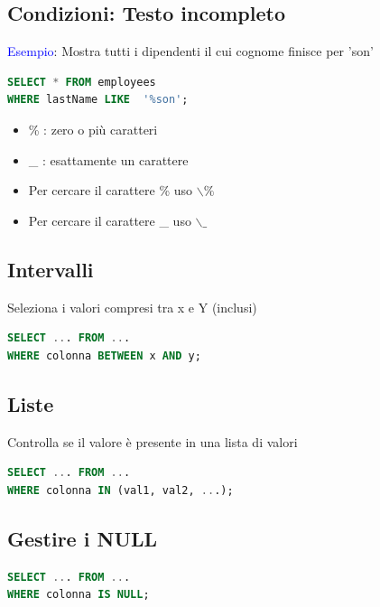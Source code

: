 \documentclass[12pt,a4paper]{article}
\begin{document}
\subsection{Condizioni: Testo incompleto}
\textcolor{blue}{Esempio}: Mostra tutti i dipendenti il cui cognome finisce per 'son'\\
\begin{lstlisting}[language = SQL]
SELECT * FROM employees
WHERE lastName LIKE  '%son';
\end{lstlisting}
\begin{itemize}
\item \% : zero o più caratteri
\item \_ : esattamente un carattere
\item Per cercare il carattere \% uso $\backslash\%$
\item Per cercare il carattere \_ uso $\backslash\_$
\end{itemize}

\subsection{Intervalli}
Seleziona i valori compresi tra x e Y (inclusi)
\begin{lstlisting}[language = SQL]
SELECT ... FROM ...
WHERE colonna BETWEEN x AND y;
\end{lstlisting}

\subsection{Liste}
Controlla se il valore è presente in una lista di valori
\begin{lstlisting}[language = SQL]
SELECT ... FROM ...
WHERE colonna IN (val1, val2, ...);
\end{lstlisting}

\subsection{Gestire i NULL}
\begin{lstlisting}[language = SQL]
SELECT ... FROM ...
WHERE colonna IS NULL;
\end{lstlisting}
\end{document}
